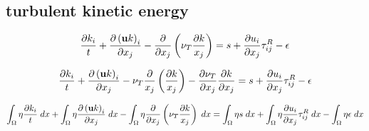 \documentclass[11pt,a4paper]{article}
\begin{document}
\subsection{turbulent kinetic energy}

\begin{dmath}
  \frac{\partial k_i}{t} + \frac{\partial \left( {\bf u} k \right)_i}{\partial x_j} - \frac{\partial}{\partial x_j} \left( \nu_T \frac{\partial k}{x_j} \right) = s + \frac{\partial u_i}{\partial x_j} \tau_{ij}^R - \epsilon
\end{dmath}

\begin{dmath}
  \frac{\partial k_i}{t} + \frac{\partial \left( {\bf u} k \right)_i}{\partial x_j} - \nu_T \frac{\partial}{x_j}\left( \frac{\partial k}{x_j} \right) - \frac{\partial \nu_T}{\partial x_j} \frac{\partial k}{\partial x_j} = s + \frac{\partial u_i}{\partial x_j} \tau_{ij}^R - \epsilon
\end{dmath}

\begin{dmath}
  \int_\Omega \eta \frac{\partial k_i}{t} \; dx + \int_\Omega \eta \frac{\partial \left( {\bf u} k \right)_i}{\partial x_j} \; dx - \int_\Omega \eta \frac{\partial}{\partial x_j} \left( \nu_T \frac{\partial k}{x_j} \right) \; dx = \int_\Omega \eta s \; dx + \int_\Omega \eta \frac{\partial u_i}{\partial x_j} \tau_{ij}^R \; dx - \int_\Omega \eta \epsilon \; dx
\end{dmath}


\end{document}
